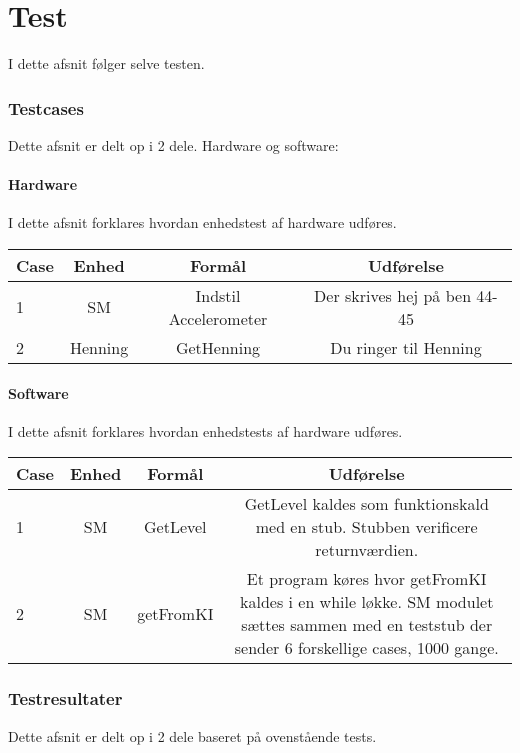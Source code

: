 \chapter{Test}
I dette afsnit følger selve testen.
\subsection{Testcases}
Dette afsnit er delt op i  2 dele. Hardware og software:\\
\subsubsection{Hardware}
I dette afsnit forklares hvordan enhedstest af hardware udføres.
\begin{table}[htbp]
\centering
\begin{tabular}{| l  | c | c | c |}
\hline
Case &Enhed &Formål &Udførelse\\\hline
1 &SM &Indstil Accelerometer &Der skrives hej på ben 44-45\\\hline
2 &Henning &GetHenning &Du ringer til Henning\\\hline
\end{tabular}
\end{table}
\subsubsection{Software}
I dette afsnit forklares hvordan enhedstests af hardware udføres.
\begin{table}[htbp]
\centering
\begin{tabular}{| l  | c | c | c |}
\hline
Case &Enhed &Formål &Udførelse\\\hline
1 &SM &GetLevel &GetLevel kaldes som funktionskald med en stub. Stubben verificere returnværdien.\\\hline
2 &SM &getFromKI &Et program køres hvor getFromKI kaldes i en while løkke. SM modulet sættes sammen med en teststub der sender 6 forskellige cases, 1000 gange.\\\hline
\end{tabular}
\end{table}
\subsection{Testresultater}
Dette afsnit er delt op i  2 dele baseret på ovenstående tests.\\
